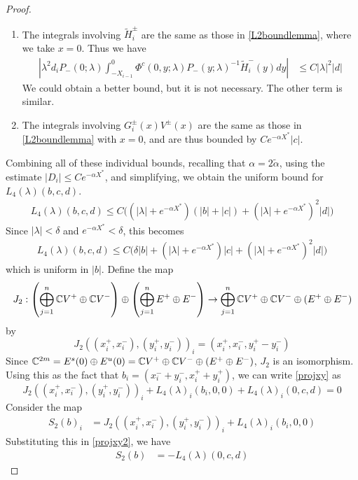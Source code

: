 \documentclass[thesis.tex]{subfiles}
\begin{document}
\begin{lemma}
\begin{proof}
\begin{enumerate}
\item The integrals involving $\tilde{H}_i^\pm$ are the same as those in \cref{L2boundlemma}, where we take $x = 0$. Thus we have
\begin{align*}
\left| \lambda^2 d_i P_-(0; \lambda) \int_{-X_{i-1}}^0 \Phi^c(0, y; \lambda) P_-(y; \lambda)^{-1} \tilde{H}_i^-(y) dy \right| &\leq C |\lambda|^2 |d| 
\end{align*}
We could obtain a better bound, but it is not necessary. The other term is similar.

\item The integrals involving $G_i^\pm(x) V^\pm(x)$ are the same as those in \cref{L2boundlemma} with $x = 0$, and are thus bounded by $C e^{-\alpha X^*} |c|$.
\end{enumerate}

Combining all of these individual bounds, recalling that $\alpha = 2 \tilde{\alpha}$, using the estimate $|D_i| \leq C e^{-\alpha X^*}$, and simplifying, we obtain the uniform bound for $L_4(\lambda)(b, c, d)$.
\begin{align*}
L_4(\lambda)(b, c, d) \leq 
C\Big( (|\lambda| + e^{-\alpha X^*})(|b| + |c|) + (|\lambda| + e^{-\alpha X^*})^2 |d|  \Big) 
\end{align*}
Since $|\lambda| < \delta$ and $e^{-\alpha X^*} < \delta$, this becomes
\begin{align*}
L_4(\lambda)(b, c, d) \leq 
C\Big( \delta |b| + (|\lambda| + e^{-\alpha X^*})|c| + (|\lambda| + e^{-\alpha X^*})^2 |d| \Big) 
\end{align*}
which is uniform in $|b|$. Define the map
\[
J_2: \left( \bigoplus_{j=1}^n \mathbb{C} V^+ \oplus \mathbb{C} V^- \right) \oplus
\left( \bigoplus_{j=1}^n E^+ \oplus E^- \right) 
\rightarrow \bigoplus_{j=1}^n \mathbb{C} V^+ \oplus \mathbb{C} V^- \oplus (E^+ \oplus E^-)
\]
by 
\[
J_2( (x_i^+, x_i^-),(y_i^+, y_i^-))_i = ( x_i^+, x_i^-, y_i^+ - y_i^- )
\]
Since $\mathbb{C}^{2m} = E^s(0) \oplus E^u(0) = \mathbb{C} V^+ \oplus \mathbb{C} V^- \oplus (E^+ \oplus E^-)$, $J_2$ is an isomorphism. Using this as the fact that $b_i = (x_i^- + y_i^-, x_i^+ + y_i^+)$, we can write \eqref{projxy} as
\begin{equation}\label{projxy2}
J_2( (x_i^+, x_i^-),(y_i^+, y_i^-))_i 
+ L_4(\lambda)_i(b_i, 0, 0) + L_4(\lambda)_i(0, c, d) = 0
\end{equation}
Consider the map
\begin{align*}
S_2(b)_i &= J_2( (x_i^+, x_i^-),(y_i^+, y_i^-))_i 
+ L_4(\lambda)_i(b_i, 0, 0) 
\end{align*}
Substituting this in \eqref{projxy2}, we have
\begin{align*}
S_2(b) &= -L_4(\lambda)(0, c, d)
\end{align*}


\end{proof}
\end{lemma}
\end{document}
